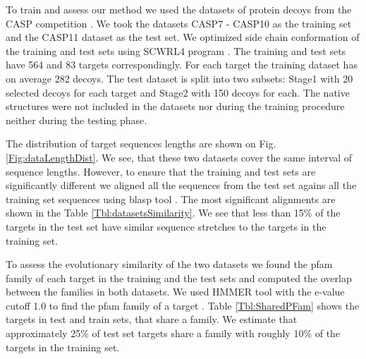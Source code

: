 To train and assess our method we used the datasets of protein decoys from the CASP competition \cite{moult2014critical}. 
We took the datasets CASP7 - CASP10 as the training set and the CASP11 dataset as the test set.
We optimized side chain conformation of the training and test sets using SCWRL4 program \cite{krivov2009improved}.
The training and test sets have 564 and 83 targets correspondingly. For each target the training dataset has 
on average 282 decoys. The test dataset is split into two subsets: Stage1 with 20 selected decoys for each target and Stage2 with 150 decoys
for each. The native structures were not included in the datasets nor during the training procedure
neither during the testing phase. 

The distribution of target sequences lengths are shown on Fig. \ref{Fig:dataLengthDist}. We see,
that these two datasets cover the same interval of sequence lengths. However, to ensure that the training 
and test sets are significantly different we aligned all the sequences from the test set agains all the training 
set sequences using blasp tool \cite{altschul1990basic}. The most significant alignments are shown in the Table \ref{Tbl:datasetsSimilarity}.
We see that less than 15\% of the targets in the test set have similar sequence stretches to the targets in the training set.

To assess the evolutionary similarity of the two datasets we found the pfam family of each target in the training and the 
test sets and computed the overlap between the families in both datasets. We used HMMER tool with the e-value cutoff 1.0 to 
find the pfam family of a target \cite{finn2016pfam}. Table \ref{Tbl:SharedPFam} shows the targets in test and train sets, that share a family. We 
estimate that approximately 25\% of test set targets share a family with roughly 10\% of the targets in the training set.

